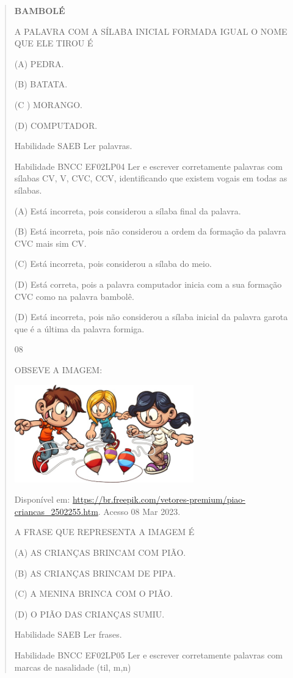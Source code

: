 {{{{\begin{verse}
{{\begin{escolha}
{{{{{\textbf{BAMBOLÉ}

A PALAVRA COM A SÍLABA INICIAL FORMADA IGUAL O NOME QUE ELE TIROU É

(A) PEDRA.

(B) BATATA.

(C ) MORANGO.

(D) COMPUTADOR.

\protect\hypertarget{_Hlk129508691}{}{}Habilidade SAEB Ler palavras.

Habilidade BNCC EF02LP04 Ler e escrever corretamente palavras com
sílabas CV, V, CVC, CCV, identificando que existem vogais em todas as
sílabas.

(A) Está incorreta, pois considerou a sílaba final da palavra.

(B) Está incorreta, pois não considerou a ordem da formação da palavra
CVC mais sim CV.

(C) Está incorreta, pois considerou a sílaba do meio.

(D) Está correta, pois a palavra computador inicia com a sua formação
CVC como na palavra bambolê.

(D) Está incorreta, pois não considerou a sílaba inicial da palavra
garota que é a última da palavra formiga.

\num{08}

OBSEVE A IMAGEM:

\includegraphics[width=3.05095in,height=1.66841in]{media/image144.jpeg}

Disponível em:
\url{https://br.freepik.com/vetores-premium/piao-criancas_2502255.htm}.
Acesso 08 Mar 2023.

A FRASE QUE REPRESENTA A IMAGEM É

(A) AS CRIANÇAS BRINCAM COM PIÃO.

(B) AS CRIANÇAS BRINCAM DE PIPA.

(C) A MENINA BRINCA COM O PIÃO.

(D) O PIÃO DAS CRIANÇAS SUMIU.

Habilidade SAEB Ler frases.

Habilidade BNCC EF02LP05 Ler e escrever corretamente palavras com marcas
de nasalidade (til, m,n)

}}}}}
\end{escolha}}}
\end{verse}}}}}
